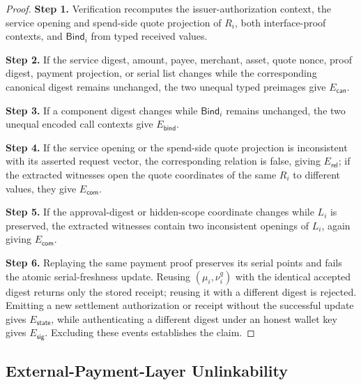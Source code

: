 \documentclass[letterpaper]{article}
\begin{document}
\begin{proof}
\textbf{Step 1.} Verification recomputes the issuer-authorization context, the
service opening and spend-side quote projection of \(R_i\), both
interface-proof contexts, and \(\mathsf{Bind}_i\) from typed received values.

\textbf{Step 2.} If the service digest, amount, payee, merchant, asset,
quote nonce, proof digest, payment
projection, or serial list changes while
the corresponding canonical digest remains unchanged, the two unequal typed
preimages give \(E_{\mathsf{can}}\).

\textbf{Step 3.} If a component digest changes while
\(\mathsf{Bind}_i\) remains unchanged, the two unequal encoded call contexts
give \(E_{\mathsf{bind}}\).

\textbf{Step 4.} If the service opening or the spend-side quote projection is
inconsistent with its asserted request vector, the corresponding relation is
false, giving \(E_{\mathsf{rel}}\); if the extracted witnesses open the quote
coordinates of the same \(R_i\) to different values, they give
\(E_{\mathsf{com}}\).

\textbf{Step 5.} If the approval-digest or hidden-scope coordinate changes
while \(L_i\) is preserved, the extracted witnesses contain two inconsistent
openings of \(L_i\), again giving \(E_{\mathsf{com}}\).

\textbf{Step 6.} Replaying the same payment proof preserves its serial points
and fails the atomic serial-freshness update. Reusing
\((\mu_i,\nu_i^q)\) with the identical accepted digest returns only the stored
receipt; reusing it with a different digest is rejected. Emitting a new
settlement authorization or receipt without the successful update gives
\(E_{\mathsf{state}}\), while authenticating a different digest under an honest
wallet key gives \(E_{\mathsf{sig}}\). Excluding these events establishes the
claim.
\end{proof}

\subsection{External-Payment-Layer Unlinkability}
\end{document}
